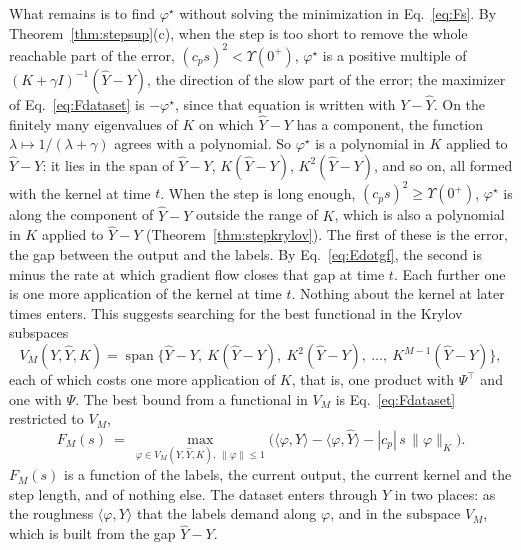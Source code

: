 \documentclass[11pt]{article}
\theoremstyle{definition}
\theoremstyle{remark}
\newcommand{\ip}[2]{\langle #1,#2\rangle}
\begin{document}
What remains is to find $\varphi^\star$ without solving the minimization in Eq.~\eqref{eq:Fs}.
By Theorem~\ref{thm:stepsup}(c), when the step is too short to remove the whole reachable part of the error, $(c_ps)^2 < \Upsilon(0^+)$, $\varphi^\star$ is a positive multiple of $(K+\gamma I)^{-1}(\hat Y - Y)$, the direction of the slow part of the error; the maximizer of Eq.~\eqref{eq:Fdataset} is $-\varphi^\star$, since that equation is written with $Y - \hat Y$.
On the finitely many eigenvalues of $K$ on which $\hat Y - Y$ has a component, the function $\lambda \mapsto 1/(\lambda+\gamma)$ agrees with a polynomial.
So $\varphi^\star$ is a polynomial in $K$ applied to $\hat Y - Y$: it lies in the span of $\hat Y - Y$, $K(\hat Y - Y)$, $K^2(\hat Y - Y)$, and so on, all formed with the kernel at time $t$.
When the step is long enough, $(c_ps)^2 \ge \Upsilon(0^+)$, $\varphi^\star$ is along the component of $\hat Y - Y$ outside the range of $K$, which is also a polynomial in $K$ applied to $\hat Y - Y$ (Theorem~\ref{thm:stepkrylov}).
The first of these is the error, the gap between the output and the labels.
By Eq.~\eqref{eq:Edotgf}, the second is minus the rate at which gradient flow closes that gap at time $t$.
Each further one is one more application of the kernel at time $t$.
Nothing about the kernel at later times enters.
This suggests searching for the best functional in the Krylov subspaces
\begin{equation}\label{eq:krylovstep}
V_M(Y, \hat Y, K) = \operatorname{span}\big\{\hat Y - Y,\ K(\hat Y - Y),\ K^2(\hat Y - Y),\ \dots,\ K^{M-1}(\hat Y - Y)\big\},
\end{equation}
each of which costs one more application of $K$, that is, one product with $\Psi^\top$ and one with $\Psi$.
The best bound from a functional in $V_M$ is Eq.~\eqref{eq:Fdataset} restricted to $V_M$,
\begin{equation}\label{eq:FMstep}
F_M(s) \ =\ \max_{\varphi\in V_M(Y,\hat Y,K),\ \|\varphi\|\le1}\Big(\ip{\varphi}{Y} - \ip{\varphi}{\hat Y} - |c_p|\,s\,\|\varphi\|_K\Big).
\end{equation}
$F_M(s)$ is a function of the labels, the current output, the current kernel and the step length, and of nothing else.
The dataset enters through $Y$ in two places: as the roughness $\ip{\varphi}{Y}$ that the labels demand along $\varphi$, and in the subspace $V_M$, which is built from the gap $\hat Y - Y$.
\end{document}
